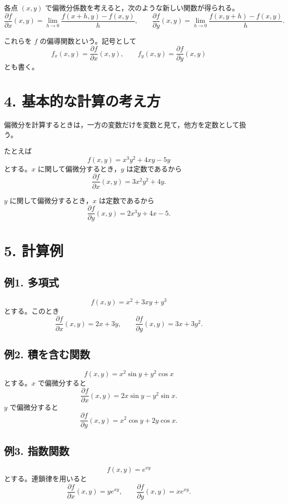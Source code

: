 \documentclass[a4paper,11pt]{jsarticle}
\begin{document}
各点 $(x,y)$ で偏微分係数を考えると，次のような新しい関数が得られる。
\[
\frac{\partial f}{\partial x}(x,y)
=\lim_{h\to 0}\frac{f(x+h,y)-f(x,y)}{h},
\qquad
\frac{\partial f}{\partial y}(x,y)
=\lim_{h\to 0}\frac{f(x,y+h)-f(x,y)}{h}.
\]

これらを $f$ の偏導関数という。記号として
\[
f_x(x,y)=\frac{\partial f}{\partial x}(x,y),
\qquad
f_y(x,y)=\frac{\partial f}{\partial y}(x,y)
\]
とも書く。

\section*{4. 基本的な計算の考え方}

偏微分を計算するときは，一方の変数だけを変数と見て，他方を定数として扱う。

たとえば
\[
f(x,y)=x^3y^2+4xy-5y
\]
とする。$x$ に関して偏微分するとき，$y$ は定数であるから
\[
\frac{\partial f}{\partial x}(x,y)
=3x^2y^2+4y.
\]

$y$ に関して偏微分するとき，$x$ は定数であるから
\[
\frac{\partial f}{\partial y}(x,y)
=2x^3y+4x-5.
\]

\section*{5. 計算例}

\subsection*{例1. 多項式}

\[
f(x,y)=x^2+3xy+y^3
\]
とする。このとき
\[
\frac{\partial f}{\partial x}(x,y)=2x+3y,
\qquad
\frac{\partial f}{\partial y}(x,y)=3x+3y^2.
\]

\subsection*{例2. 積を含む関数}

\[
f(x,y)=x^2\sin y+y^2\cos x
\]
とする。$x$ で偏微分すると
\[
\frac{\partial f}{\partial x}(x,y)
=2x\sin y-y^2\sin x.
\]
$y$ で偏微分すると
\[
\frac{\partial f}{\partial y}(x,y)
=x^2\cos y+2y\cos x.
\]

\subsection*{例3. 指数関数}

\[
f(x,y)=e^{xy}
\]
とする。連鎖律を用いると
\[
\frac{\partial f}{\partial x}(x,y)=ye^{xy},
\qquad
\frac{\partial f}{\partial y}(x,y)=xe^{xy}.
\]
\end{document}

